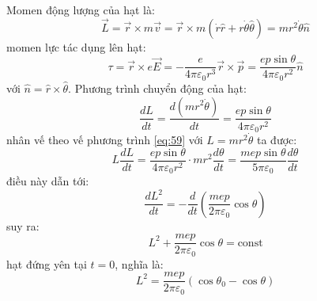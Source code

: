 \noindent{} Momen động lượng của hạt là:
\begin{equation}
  \label{eq:57}
  \vec{L}=\vec{r}\times m \vec{v}=\vec{r}\times m(\dot{r}\hat{r}+r\dot{\theta}\hat{\theta})=mr^{2}\dot{\theta}\hat{n}
\end{equation}
momen lực tác dụng lên hạt:
\begin{equation}
  \label{eq:58}
  \tau=\vec{r}\times e\vec{E}=-\frac{e}{4\pi\varepsilon_{0}r^{3}}\vec{r}\times\vec{p}=\frac{ep\sin\theta}{4\pi\varepsilon_{0}r^{2}}\hat{n}
\end{equation}
với $\hat{n}=\hat{r}\times\hat{\theta}$. Phương trình chuyển động của hạt:
\begin{equation}
  \label{eq:59}
  \frac{dL}{dt}=\frac{d(mr^{2}\dot{\theta})}{dt}=\frac{ep\sin\theta}{4\pi\varepsilon_{0}r^{2}}
\end{equation}
nhân vế theo vế phương trình \eqref{eq:59} với $L=mr^{2}\dot{\theta}$ ta được:
\begin{equation*}
  L\frac{dL}{dt}=\frac{ep\sin\theta}{4\pi\varepsilon_{0}r^{2}}\cdot mr^{2}\frac{d\theta}{dt}=\frac{mep\sin\theta}{5\pi\varepsilon_{0}}\frac{d\theta}{dt}
\end{equation*}
điều này dẫn tới:
\begin{equation*}
  \frac{dL^{2}}{dt}=-\frac{d}{dt}\left(\frac{mep}{2\pi\varepsilon_{0}}\cos\theta\right)
\end{equation*}
suy ra:
\begin{equation}
  \label{eq:510}
  L^{2}+\frac{mep}{2\pi\varepsilon_{0}}\cos\theta=\text{const}
\end{equation}
hạt đứng yên tại $t=0$, nghĩa là:
\begin{equation}
  \label{eq:511}
  L^{2}=\frac{mep}{2\pi\varepsilon_{0}}(\cos\theta_{0}-\cos\theta)
\end{equation}

